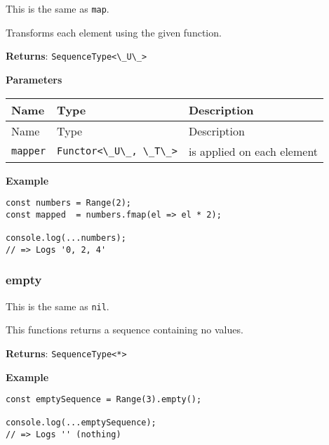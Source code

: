 This is the same as \passthrough{\lstinline!map!}.

Transforms each element using the given function.

\textbf{Returns}: \passthrough{\lstinline!SequenceType<\_U\_>!}

\textbf{Parameters}

\begin{longtable}[]{
  >{\raggedright\arraybackslash}p{}
  >{\raggedright\arraybackslash}p{}
  >{\raggedright\arraybackslash}p{}@{}}

\toprule\noalign{}
Name & Type & Description \\
\midrule\noalign{}
\endfirsthead
\toprule\noalign{}
Name & Type & Description \\
\midrule\noalign{}
\endhead
\bottomrule\noalign{}
\endlastfoot
\passthrough{\lstinline!mapper!} &
\passthrough{\lstinline!Functor<\_U\_, \_T\_>!} & is applied on each
element \\
\end{longtable}

\textbf{Example}

\begin{lstlisting}[label=d2a3e994-68fb-4dca-a954-00bb8432648a]
const numbers = Range(2);
const mapped  = numbers.fmap(el => el * 2);
                                           
console.log(...numbers);
// => Logs '0, 2, 4'
\end{lstlisting}

\hypertarget{3d33c9f7-0aaa-425e-8772-3ef34221985a}{%
\subsubsection{empty}\label{3d33c9f7-0aaa-425e-8772-3ef34221985a}}

This is the same as \passthrough{\lstinline!nil!}.

This functions returns a sequence containing no values.

\textbf{Returns}: \passthrough{\lstinline!SequenceType<*>!}

\textbf{Example}

\begin{lstlisting}[label=ec0f0760-4956-481e-97d0-799b1f33e68d]
const emptySequence = Range(3).empty();
                              
console.log(...emptySequence);
// => Logs '' (nothing)
\end{lstlisting}

